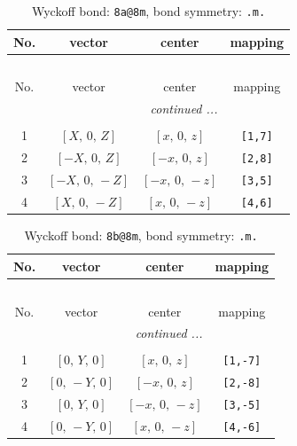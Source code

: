 \documentclass[fleqn,8pt]{jsarticle}
\begin{document}
\begin{longtable}{cccc}
\caption{Wyckoff bond: {\tt 8a@8m}, bond symmetry: {\tt .m.}}
 \\
 \hline \hline
No. & vector & center & mapping \\ \hline \endfirsthead

\multicolumn{3}{l}{\tablename\ \thetable{}} \\
 \hline \hline
No. & vector & center & mapping \\ \hline \endhead

 \hline \hline
\multicolumn{3}{r}{\footnotesize\it continued ...} \\ \endfoot

 \hline \hline
\multicolumn{3}{r}{} \\ \endlastfoot

1 & $\left[ X,\, 0,\, Z \right]$ & $\left[ x,\, 0,\, z \right]$ & {\tt [1,7]} \\ \hline
2 & $\left[ - X,\, 0,\, Z \right]$ & $\left[ - x,\, 0,\, z \right]$ & {\tt [2,8]} \\ \hline
3 & $\left[ - X,\, 0,\, - Z \right]$ & $\left[ - x,\, 0,\, - z \right]$ & {\tt [3,5]} \\ \hline
4 & $\left[ X,\, 0,\, - Z \right]$ & $\left[ x,\, 0,\, - z \right]$ & {\tt [4,6]} \\
\end{longtable}
\renewcommand{\arraystretch}{1.2}
\begin{longtable}{cccc}
\caption{Wyckoff bond: {\tt 8b@8m}, bond symmetry: {\tt .m.}}
 \\
 \hline \hline
No. & vector & center & mapping \\ \hline \endfirsthead

\multicolumn{3}{l}{\tablename\ \thetable{}} \\
 \hline \hline
No. & vector & center & mapping \\ \hline \endhead

 \hline \hline
\multicolumn{3}{r}{\footnotesize\it continued ...} \\ \endfoot

 \hline \hline
\multicolumn{3}{r}{} \\ \endlastfoot

1 & $\left[ 0,\, Y,\, 0 \right]$ & $\left[ x,\, 0,\, z \right]$ & {\tt [1,-7]} \\ \hline
2 & $\left[ 0,\, - Y,\, 0 \right]$ & $\left[ - x,\, 0,\, z \right]$ & {\tt [2,-8]} \\ \hline
3 & $\left[ 0,\, Y,\, 0 \right]$ & $\left[ - x,\, 0,\, - z \right]$ & {\tt [3,-5]} \\ \hline
4 & $\left[ 0,\, - Y,\, 0 \right]$ & $\left[ x,\, 0,\, - z \right]$ & {\tt [4,-6]} \\
\end{longtable}
\end{document}
